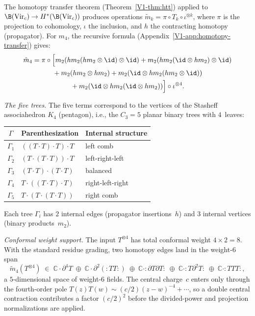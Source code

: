 \begin{computation}
\label{comp:virasoro-m4}
The homotopy transfer theorem (Theorem~\ref{V1-thm:htt}) applied to
$\B(\mathrm{Vir}_c) \to H^*(\B(\mathrm{Vir}_c))$
produces operations $\tilde{m}_k = \pi \circ T_k \circ \iota^{\otimes k}$,
where $\pi$ is the projection to cohomology, $\iota$ the inclusion,
and $h$ the contracting homotopy (propagator).
For $m_4$, the recursive formula
(Appendix~\ref{V1-app:homotopy-transfer}) gives:
\begin{multline}\label{eq:m4-transfer}
\tilde{m}_4 = \pi \circ \Bigl[
m_2(hm_2(hm_2 \otimes \id)\otimes \id) +
m_2(hm_2(\id \otimes hm_2)\otimes \id) \\
{} + m_2(hm_2 \otimes hm_2) +
m_2(\id \otimes hm_2(hm_2 \otimes \id)) \\
{} + m_2(\id \otimes hm_2(\id \otimes hm_2))
\Bigr] \circ \iota^{\otimes 4}.
\end{multline}

\emph{The five trees.}
The five terms correspond to the vertices of the Stasheff
associahedron $K_4$ (pentagon), i.e., the $C_3 = 5$ planar binary
trees with $4$~leaves:
\begin{center}
\renewcommand{\arraystretch}{1.3}
\begin{tabular}{cll}
\toprule
$\Gamma$ & Parenthesization & Internal structure \\
\midrule
$\Gamma_1$ & $((T \cdot T) \cdot T) \cdot T$ & left comb \\
$\Gamma_2$ & $(T \cdot (T \cdot T)) \cdot T$ & left-right-left \\
$\Gamma_3$ & $(T \cdot T) \cdot (T \cdot T)$ & balanced \\
$\Gamma_4$ & $T \cdot ((T \cdot T) \cdot T)$ & right-left-right \\
$\Gamma_5$ & $T \cdot (T \cdot (T \cdot T))$ & right comb \\
\bottomrule
\end{tabular}
\end{center}
Each tree $\Gamma_i$ has $2$ internal edges (propagator insertions~$h$)
and $3$ internal vertices (binary products~$m_2$).

\emph{Conformal weight support.}
The input $T^{\otimes 4}$ has total conformal weight $4 \times 2 = 8$.
With the standard residue grading, two homotopy edges land in the
weight-\(6\) span
\begin{equation}\label{eq:m4-weight-analysis}
\widetilde m_4(T^{\otimes 4}) \;\in\; \mathbb{C}\cdot\partial^4 T \;\oplus\;
\mathbb{C}\cdot \partial^2({:}TT{:}) \;\oplus\;
\mathbb{C}\cdot {:}\partial T \partial T{:} \;\oplus\;
\mathbb{C}\cdot {:}T\partial^2 T{:} \;\oplus\;
\mathbb{C}\cdot {:}TTT{:},
\end{equation}
a \(5\)-dimensional space of weight-\(6\) fields. The central
charge~\(c\) enters only through the fourth-order pole
$T(z)T(w) \sim (c/2)(z-w)^{-4} + \cdots$,
so a double central contraction contributes a factor \((c/2)^2\)
before the divided-power and projection normalizations are applied.


\end{computation}
